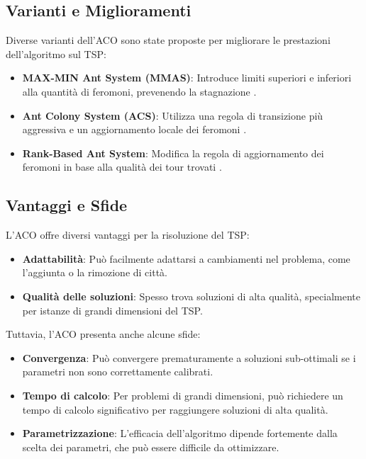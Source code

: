 \subsection{Varianti e Miglioramenti}

Diverse varianti dell'\gls{ACO} sono state proposte per migliorare le prestazioni dell'algoritmo sul \gls{TSP}:

\begin{itemize}
	\item \textbf{MAX-MIN Ant System (\gls{MMAS})}: Introduce limiti superiori e inferiori alla quantità di feromoni, prevenendo la stagnazione \cite{stutzle2000max}.
	\item \textbf{Ant Colony System (\gls{ACS})}: Utilizza una regola di transizione più aggressiva e un aggiornamento locale dei feromoni \cite{dorigo1997ant}.
	\item \textbf{Rank-Based Ant System}: Modifica la regola di aggiornamento dei feromoni in base alla qualità dei tour trovati \cite{bullnheimer1999rank}.
\end{itemize}

\subsection{Vantaggi e Sfide}

L'ACO offre diversi vantaggi per la risoluzione del \gls{TSP}:

\begin{itemize}
	\item \textbf{Adattabilità}: Può facilmente adattarsi a cambiamenti nel problema, come l'aggiunta o la rimozione di città.
	\item \textbf{Qualità delle soluzioni}: Spesso trova soluzioni di alta qualità, specialmente per istanze di grandi dimensioni del \gls{TSP}.
\end{itemize}

Tuttavia, l'\gls{ACO} presenta anche alcune sfide:

\begin{itemize}
	\item \textbf{Convergenza}: Può convergere prematuramente a soluzioni sub-ottimali se i parametri non sono correttamente calibrati.
	\item \textbf{Tempo di calcolo}: Per problemi di grandi dimensioni, può richiedere un tempo di calcolo significativo per raggiungere soluzioni di alta qualità.
	\item \textbf{Parametrizzazione}: L'efficacia dell'algoritmo dipende fortemente dalla scelta dei parametri, che può essere difficile da ottimizzare.
\end{itemize}

